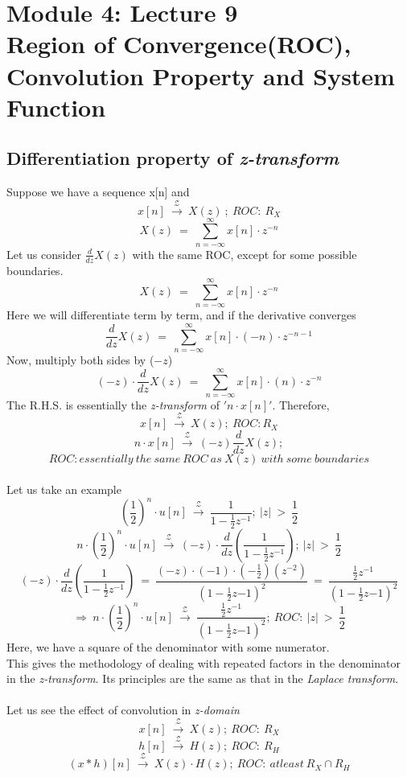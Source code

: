 \section{Module 4: Lecture 9\\Region of Convergence(ROC), Convolution Property and System Function}


\subsection{Differentiation property of \textit{z-transform}}
Suppose we have a sequence x[n] and
\[
x[n]\ \xrightarrow{\ \mathcal{Z} \ }\ X(z)\ ;\ ROC:\ R_X
\]
\[
X(z)\ =\ \sum\limits_{n=-\infty}^{\infty}x[n]\cdot z^{-n}
\]
Let us consider $\frac{d}{dz}X(z)$ with the same ROC, except for some possible boundaries.
\[
X(z)\ =\ \sum\limits_{n=-\infty}^{\infty}x[n]\cdot z^{-n}
\]
Here we will differentiate term by term, and if the derivative converges
\[
\frac{d}{dz}X(z)\ =\ \sum\limits_{n=-\infty}^{\infty}x[n]\cdot(-n)\cdot z^{-n-1}
\]
Now, multiply both sides by ($-z$)
\[
(-z)\cdot\frac{d}{dz}X(z)\ =\ \sum\limits_{n=-\infty}^{\infty}x[n]\cdot(n)\cdot z^{-n}
\]
The R.H.S. is essentially the \textit{z-transform} of $'n\cdot x[n]'$. Therefore,
\[
x[n]\ \xrightarrow{\ \mathcal{Z} \ }\ X(z);\ ROC: R_X
\]
\[
n\cdot x[n]\ \xrightarrow{\ \mathcal{Z}\ }\ (-z)\frac{d}{dz}X(z);
\]
\[
ROC: essentially\ the\ same\ ROC\ as\ X(z)\ with\ some\ boundaries
\]\\
Let us take an example
\[
(\frac{1}{2})^n\cdot u[n]\ \xrightarrow{\ \mathcal{Z} \ }\ \frac{1}{1 - \frac{1}{2}z^{-1}};\ |z|\ >\ \frac{1}{2}
\]
\[
n\cdot (\frac{1}{2})^n\cdot u[n]\ \xrightarrow{\ \mathcal{Z} \ }\ (-z)\cdot\frac{d}{dz}(\frac{1}{1 - \frac{1}{2}z^{-1}});\ |z|\ >\ \frac{1}{2} 
\]
\[
(-z)\cdot\frac{d}{dz}(\frac{1}{1 - \frac{1}{2}z^{-1}})\ =\ \frac{(-z)\cdot(-1)\cdot(-\frac{1}{2})(z^{-2})}{(1 - \frac{1}{2}z{-1})^2}\ =\ \frac{\frac{1}{2}z^{-1}}{(1 - \frac{1}{2}z{-1})^2}
\]
\[
\Rightarrow\ n\cdot (\frac{1}{2})^n\cdot u[n]\ \xrightarrow{\ \mathcal{Z} \ }\ \frac{\frac{1}{2}z^{-1}}{(1 - \frac{1}{2}z{-1})^2};\ ROC:\ |z|\ >\ \frac{1}{2}
\]
Here, we have a square of the denominator with some numerator.\\
This gives the methodology of dealing with repeated factors in the denominator in the \textit{z-transform}. Its principles are the same as that in the \textit{Laplace transform}.\\\\
Let us see the effect of convolution in \textit{z-domain}
\[
x[n]\ \xrightarrow{\ \mathcal{Z} \ }\ X(z);\ ROC:\ R_X
\]
\[
h[n]\ \xrightarrow{\ \mathcal{Z} \ }\ H(z);\ ROC:\ R_H
\]
\[
(x*h)[n]\ \xrightarrow{\ \mathcal{Z} \ }\ X(z)\cdot H(z);\ ROC:\ atleast\ R_X \cap  R_H 
\]
